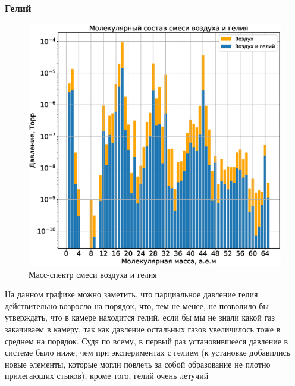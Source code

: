 \documentclass[a4paper,14pt]{extarticle}
\begin{document}
			\subsubsection{Гелий}
				\begin{figure}[h!]
					\centering
					\includegraphics[width=.75\linewidth]{Lab2_3.eps}
					\caption{Масс-спектр смеси воздуха и гелия}
					\label{fig5}
				\end{figure}
				На данном графике можно заметить, что парциальное давление гелия действительно возросло на порядок, что, тем не менее, не позволило бы утверждать, что в камере находится гелий, если бы мы не знали какой газ закачиваем в камеру, так как давление остальных газов увеличилось тоже в среднем на порядок. Судя по всему, в первый раз установившееся давление в системе было ниже, чем при экспериментах с гелием (к установке добавились новые элементы, которые могли повлечь за собой образование не плотно прилегающих стыков), кроме того, гелий очень летучий
				\newpage
\end{document}
